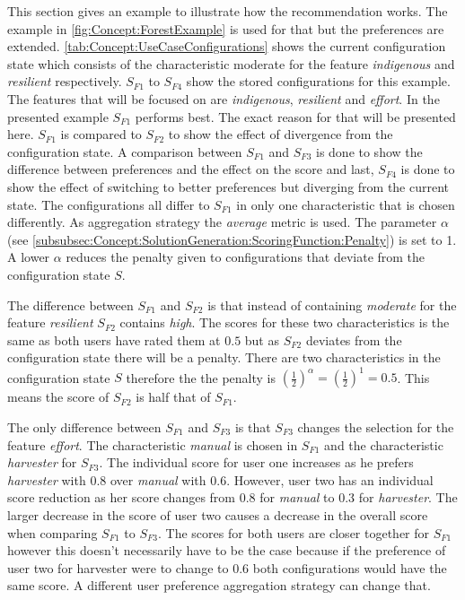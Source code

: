 This section gives an example to illustrate how the recommendation works. The example in \autoref{fig:Concept:ForestExample} is used for that but the preferences are extended. \autoref{tab:Concept:UseCaseConfigurations} shows the current configuration state which consists of the characteristic moderate for the feature \textit{indigenous} and  \textit{resilient} respectively. $S_{F1}$ to $S_{F4}$ show the stored configurations for this example. The features that will be focused on are \textit{indigenous}, \textit{resilient} and \textit{effort}. In the presented example $S_{F1}$ performs best. The exact reason for that will be presented here. $S_{F1}$ is compared to $S_{F2}$ to show the effect of divergence from the configuration state.  A comparison between $S_{F1}$  and $S_{F3}$ is done to show the difference between preferences and the effect on the score and last, $S_{F4}$ is done to show the effect of switching to better preferences but diverging from the current state. The configurations all differ to $S_{F1}$ in only one characteristic that is chosen differently. As aggregation strategy the \emph{average} metric is used. The parameter $\alpha$ (see \autoref{subsubsec:Concept:SolutionGeneration:ScoringFunction:Penalty}) is set to 1. A lower $\alpha$ reduces the penalty given to configurations that deviate from the configuration state $S$.

The difference between  $S_{F1}$ and  $S_{F2}$ is that instead of containing \emph{moderate} for the feature \emph{resilient} $S_{F2}$ contains \emph{high}. The scores for these two characteristics is the same as both users have rated them at $0.5$ but as $S_{F2}$ deviates from the configuration state there will be a penalty. There are two characteristics in the configuration state $S$ therefore the the penalty is $(\frac{1}{2})^\alpha = (\frac{1}{2})^1 = 0.5$. This means the score of $S_{F2}$ is half that of $S_{F1}$.

The only difference between $S_{F1}$ and $S_{F3}$ is that $S_{F3}$ changes the selection for the feature \emph{effort}. The characteristic \emph{manual} is chosen in $S_{F1}$ and the characteristic \emph{harvester} for $S_{F3}$. The individual score for user one increases as he prefers \emph{harvester} with $0.8$ over \emph{manual} with $0.6$. However, user two has an individual score reduction as her score changes from $0.8$ for \emph{manual} to $0.3$ for \emph{harvester}. The larger decrease in the score of user two causes a decrease in the overall score when comparing  $S_{F1}$ to $S_{F3}$. The scores for both users are closer together for $S_{F1}$ however this doesn't necessarily have to be the case because if the preference of user two for harvester were to change to $0.6$ both configurations would have the same score. A different user preference aggregation strategy can change that.

